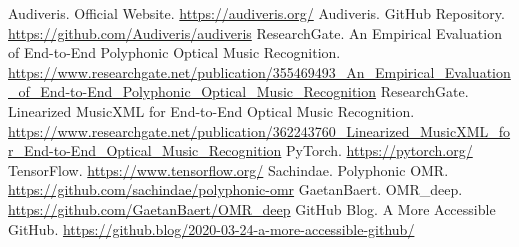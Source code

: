 \begin{thebibliography}{99}
 Audiveris. Official Website. \url{https://audiveris.org/}
 Audiveris. GitHub Repository. \url{https://github.com/Audiveris/audiveris}
 ResearchGate. An Empirical Evaluation of End-to-End Polyphonic Optical Music Recognition. \url{https://www.researchgate.net/publication/355469493_An_Empirical_Evaluation_of_End-to-End_Polyphonic_Optical_Music_Recognition}
 ResearchGate. Linearized MusicXML for End-to-End Optical Music Recognition. \url{https://www.researchgate.net/publication/362243760_Linearized_MusicXML_for_End-to-End_Optical_Music_Recognition}
 PyTorch. \url{https://pytorch.org/}
 TensorFlow. \url{https://www.tensorflow.org/}
 Sachindae. Polyphonic OMR. \url{https://github.com/sachindae/polyphonic-omr}
 GaetanBaert. OMR\_deep. \url{https://github.com/GaetanBaert/OMR\_deep}
 GitHub Blog. A More Accessible GitHub. \url{https://github.blog/2020-03-24-a-more-accessible-github/}


\end{thebibliography}

